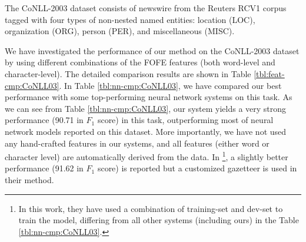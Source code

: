 \documentclass[11pt,a4paper]{article}
\newcommand{\cmark}{\ding{51}}
\newcommand{\xmark}{\ding{55}}
\begin{document}
The CoNLL-2003 dataset \cite{tjong2003introduction} consists of newswire from the Reuters RCV1 corpus tagged with four types of non-nested named entities: location (LOC), organization (ORG), person (PER), and miscellaneous (MISC).

We have investigated the performance of our method on the CoNLL-2003 dataset by using different combinations of the FOFE features (both word-level and character-level). The detailed comparison results are shown in Table \ref{tbl:feat-cmp:CoNLL03}.  In Table \ref{tbl:nn-cmp:CoNLL03}, we have compared our best performance with some top-performing neural network systems on this task. As we can see from Table \ref{tbl:nn-cmp:CoNLL03}, our system yields a very strong performance (90.71 in $F_1$ score) in this task, outperforming most of neural network models reported on this dataset. More importantly, we have not used any hand-crafted features in our systems, and all features (either word or character level) are automatically derived from the data. 
In \cite{chiu2016named}\footnote{In this work, they have used a combination of training-set and dev-set to train the model, differing from all other systems (including ours) in the Table \ref{tbl:nn-cmp:CoNLL03}.}, a slightly better performance (91.62 in $F_1$ score) is reported but a customized gazetteer is used in their method.


\end{document}
